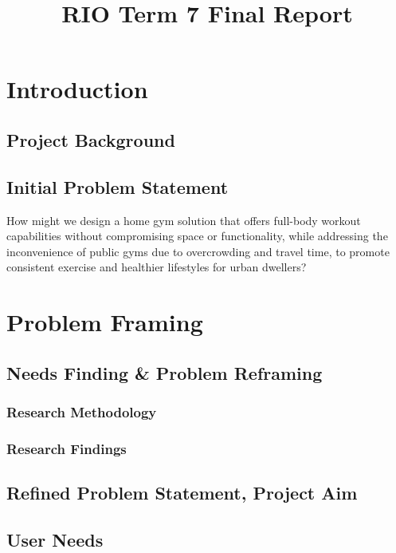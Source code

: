 \documentclass[12pt,oneside,letterpaper,english]{article}
\title{RIO Term 7 Final Report} %
\begin{document}


\newpage
\doublespacing
\renewcommand{\baselinestretch}{1}\normalsize
\tableofcontents
\renewcommand{\baselinestretch}{1}\normalsize
\thispagestyle{fancy} %

\newpage
{} 

\section{Introduction} \label{ch1}
\subsection{Project Background}
\subsection{Initial Problem Statement}
How might we design a home gym solution that offers full-body workout capabilities without compromising space or functionality, while addressing the inconvenience of public gyms due to overcrowding and travel time, to promote consistent exercise and healthier lifestyles for urban dwellers?

\newpage
{} 
\section{Problem Framing}
\subsection{Needs Finding \& Problem Reframing}
\subsubsection{Research Methodology}
\subsubsection{Research Findings}
\subsection{Refined Problem Statement, Project Aim}
\subsection{User Needs}
\end{document}
